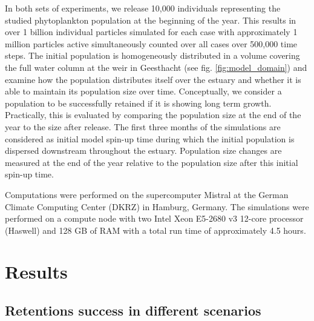 \documentclass[npg, manuscript]{copernicus}
\begin{document}
In both sets of experiments, we release 10,000 individuals representing the studied phytoplankton population at the beginning of the year.
This results in over 1 billion individual particles simulated for each case with approximately 1 million particles active simultaneously counted over all cases over 500,000 time steps.
The initial population is homogeneously distributed in a volume covering the full water column at the weir in Geesthacht (see fig. \ref{fig:model_domain}) and examine how the population distributes itself over the estuary and whether it is able to maintain its population size over time.
Conceptually, we consider a population to be successfully retained if it is showing long term growth. 
Practically, this is evaluated by comparing the population size at the end of the year to the size after release.
The first three months of the simulations are considered as initial model spin-up time during which the initial population is dispersed downstream throughout the estuary.
Population size changes are measured at the end of the year relative to the population size after this initial spin-up time.

Computations were performed on the supercomputer Mistral at the German Climate Computing Center (DKRZ) in Hamburg, Germany.
The simulations were performed on a compute node with two  Intel Xeon E5-2680 v3 12-core processor (Haswell) and 128 GB of RAM with a total run time of approximately 4.5 hours.

\section{Results}

\subsection{Retentions success in different scenarios}
\end{document}
